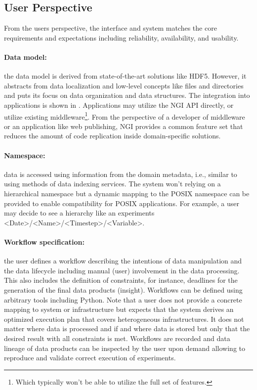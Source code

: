 \documentclass[a4paper, twocolumn]{article}
\begin{document}
\subsection{User Perspective}

\newcommand{\bnf}[1]{\textless #1\textgreater}

From the users perspective, the interface and system matches the core requirements and expectations including reliability, availability, and usability.

\paragraph{Data model:} the data model is derived from state-of-the-art solutions like HDF5.
However, it abstracts from data localization and low-level concepts like files and directories and puts its focus on data organization and data structures.
The integration into applications is shown in .
Applications may utilize the NGI API directly, or utilize existing middleware\footnote{Which typically won't be able to utilize the full set of features.}.
From the perspective of a developer of middleware or an application like web publishing, NGI provides a common feature set that reduces the amount of code replication inside domain-specific solutions.


\paragraph{Namespace:} data is accessed using information from the domain metadata, i.e., similar to using methods of data indexing services.
The system won't relying on a hierarchical namespace but a dynamic mapping to the POSIX namespace can be provided to enable compatibility for POSIX applications.
For example, a user may decide to see a hierarchy like an experiments \bnf{Date}/\bnf{Name}/\bnf{Timestep}/\bnf{Variable}.

\paragraph{Workflow specification:} the user defines a workflow describing the intentions of data manipulation and the data lifecycle including manual (user) involvement in the data processing.
This also includes the definition of constraints, for instance, deadlines for the generation of the final data products (insight).
Workflows can be defined using arbitrary tools including Python.
Note that a user does not provide a concrete mapping to system or infrastructure but expects that the system derives an optimized execution plan that covers heterogeneous infrastructures.
It does not matter where data is processed and if and where data is stored but only that the desired result with all constraints is met.
Workflows are recorded and data lineage of data products can be inspected by the user upon demand allowing to reproduce and validate correct execution of experiments.
\end{document}
